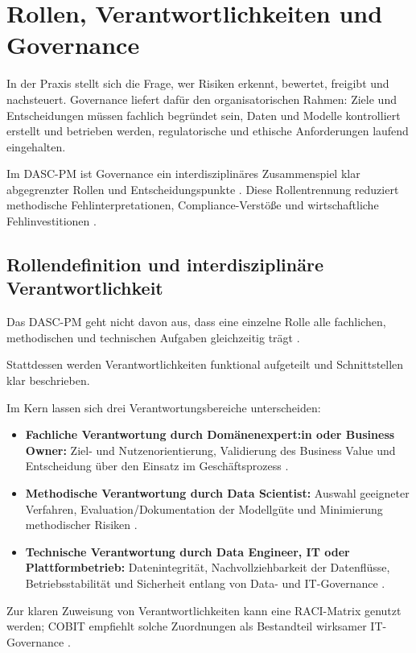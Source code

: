 \section{Rollen, Verantwortlichkeiten und Governance}

In der Praxis stellt sich die Frage, wer Risiken erkennt, bewertet, freigibt und nachsteuert.
Governance liefert dafür den organisatorischen Rahmen: Ziele und Entscheidungen müssen fachlich begründet sein,
Daten und Modelle kontrolliert erstellt und betrieben werden, regulatorische und ethische Anforderungen laufend eingehalten.

Im DASC-PM ist Governance ein interdisziplinäres Zusammenspiel klar abgegrenzter Rollen und Entscheidungspunkte \cite{schulz_dasc-pm_2022}.
Diese Rollentrennung reduziert methodische Fehlinterpretationen, Compliance-Verstöße und wirtschaftliche Fehlinvestitionen \cite{Saltz2015}.

\subsection{Rollendefinition und interdisziplinäre Verantwortlichkeit}
Das DASC-PM geht nicht davon aus, dass eine einzelne Rolle alle fachlichen, methodischen und technischen Aufgaben gleichzeitig trägt \cite{Saltz2015,schulz_dasc-pm_2022}.

Stattdessen werden Verantwortlichkeiten funktional aufgeteilt und Schnittstellen klar beschrieben.

Im Kern lassen sich drei Verantwortungsbereiche unterscheiden:
\begin{itemize}
  \item \textbf{Fachliche Verantwortung durch Domänenexpert:in oder Business Owner:}
        Ziel- und Nutzenorientierung, Validierung des Business Value und Entscheidung über den Einsatz im Geschäftsprozess \cite{schulz_dasc-pm_2022}.
  \item \textbf{Methodische Verantwortung durch Data Scientist:}
        Auswahl geeigneter Verfahren, Evaluation/Dokumentation der Modellgüte und Minimierung methodischer Risiken \cite{schulz_dasc-pm_2022}.
  \item \textbf{Technische Verantwortung durch Data Engineer, IT oder Plattformbetrieb:}
        Datenintegrität, Nachvollziehbarkeit der Datenflüsse, Betriebsstabilität und Sicherheit entlang von Data- und IT-Governance \cite{Sculley2015}.
\end{itemize}

Zur klaren Zuweisung von Verantwortlichkeiten kann eine RACI-Matrix genutzt werden; COBIT empfiehlt solche Zuordnungen als Bestandteil wirksamer IT-Governance \cite{ISACA2018}.

